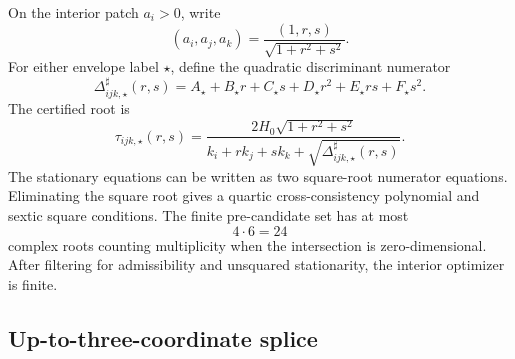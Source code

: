 On the interior patch \(a_i>0\), write
\begin{equation}
\label{eq:app-part06-triple-ratio-coords}
(a_i,a_j,a_k)=\frac{(1,r,s)}{\sqrt{1+r^2+s^2}}.
\end{equation}
For either envelope label \(\star\), define the quadratic discriminant numerator
\begin{equation}
\label{eq:app-part06-triple-discriminant}
\Delta_{ijk,\star}^{\sharp}(r,s)=
A_\star+B_\star r+C_\star s+D_\star r^2+E_\star rs+F_\star s^2.
\end{equation}
The certified root is
\begin{equation}
\label{eq:app-part06-triple-root}
\tau_{ijk,\star}(r,s)
=
\frac{2H_0\sqrt{1+r^2+s^2}}
{k_i+rk_j+sk_k+\sqrt{\Delta_{ijk,\star}^{\sharp}(r,s)}}.
\end{equation}
The stationary equations can be written as two square-root numerator equations.  Eliminating the square root gives a quartic cross-consistency polynomial and sextic square conditions.  The finite pre-candidate set has at most
\begin{equation}
\label{eq:app-part06-triple-bezout}
4\cdot 6=24
\end{equation}
complex roots counting multiplicity when the intersection is zero-dimensional.  After filtering for admissibility and unsquared stationarity, the interior optimizer is finite.

\subsection{Up-to-three-coordinate splice}
\label{subsec:app-part06-up-to-three-coordinate-splice}


